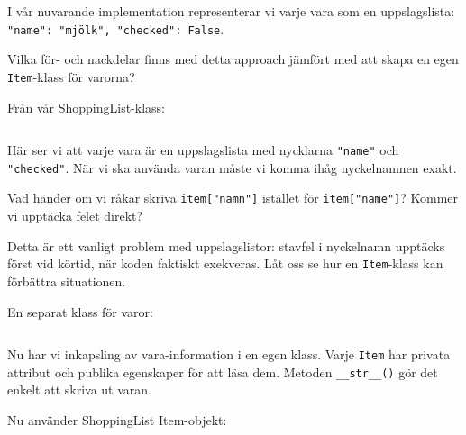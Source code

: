 \begin{exercise}
  I vår nuvarande implementation representerar vi varje vara som en
  uppslagslista: \texttt{{"name": "mjölk", "checked": False}}.

  Vilka för- och nackdelar finns med detta approach jämfört med att skapa
  en egen \texttt{Item}-klass för varorna?
\end{exercise}

\begin{frame}[fragile]
  \begin{example}
    Från vår ShoppingList-klass:
    \inputminted[linenos,firstline=8,lastline=14]{python}{examples/shopping.py}
  \end{example}
\end{frame}

Här ser vi att varje vara är en uppslagslista med nycklarna
\texttt{"name"} och \texttt{"checked"}.
När vi ska använda varan måste vi komma ihåg nyckelnamnen exakt.

\begin{exercise}
  Vad händer om vi råkar skriva \texttt{item["namn"]} istället för
  \texttt{item["name"]}? Kommer vi upptäcka felet direkt?
\end{exercise}

Detta är ett vanligt problem med uppslagslistor: stavfel i nyckelnamn upptäcks
först vid körtid, när koden faktiskt exekveras. Låt oss se hur en
\texttt{Item}-klass kan förbättra situationen.

\begin{frame}[fragile]
  \begin{example}
    En separat klass för varor:
    \inputminted[linenos,firstline=3,lastline=28]{python}{examples/shopping_with_items.py}
  \end{example}
\end{frame}

Nu har vi inkapsling av vara-information i en egen klass. Varje
\texttt{Item} har privata attribut och publika egenskaper
för att läsa dem. Metoden \texttt{__str__()} gör det enkelt
att skriva ut varan.

\begin{frame}[fragile]
  \begin{example}
    Nu använder ShoppingList Item-objekt:
    \inputminted[linenos,firstline=31,lastline=54]{python}{examples/shopping_with_items.py}
  \end{example}
\end{frame}

